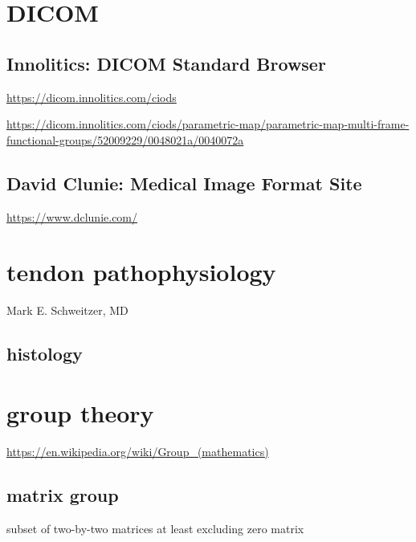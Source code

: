 \documentclass[
]{book}
\theoremstyle{definition}
\theoremstyle{definition}
\theoremstyle{definition}
\theoremstyle{definition}
\theoremstyle{remark}
\begin{document}
\hypertarget{dicom}{%
\chapter{DICOM}\label{dicom}}

\hypertarget{innolitics-dicom-standard-browser}{%
\section{Innolitics: DICOM Standard Browser}\label{innolitics-dicom-standard-browser}}

\url{https://dicom.innolitics.com/ciods}

\url{https://dicom.innolitics.com/ciods/parametric-map/parametric-map-multi-frame-functional-groups/52009229/0048021a/0040072a}

\hypertarget{david-clunie-medical-image-format-site}{%
\section{David Clunie: Medical Image Format Site}\label{david-clunie-medical-image-format-site}}

\url{https://www.dclunie.com/}

\hypertarget{tendon-pathophysiology}{%
\chapter{tendon pathophysiology}\label{tendon-pathophysiology}}

Mark E. Schweitzer, MD

\hypertarget{histology}{%
\section{histology}\label{histology}}

\hypertarget{group-theory}{%
\chapter{group theory}\label{group-theory}}

\url{https://en.wikipedia.org/wiki/Group_(mathematics)}

\hypertarget{matrix-group}{%
\section{matrix group}\label{matrix-group}}

subset of two-by-two matrices at least excluding zero matrix
\end{document}
